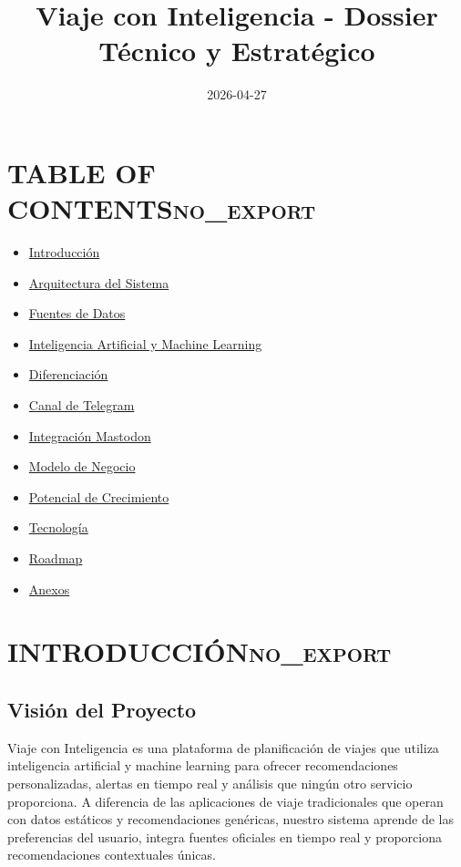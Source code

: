 \documentclass[11pt]{article}
\date{2026-04-27}
\title{Viaje con Inteligencia - Dossier Técnico y Estratégico}
\begin{document}
\maketitle
\tableofcontents


\section*{TABLE OF CONTENTS\hfill{}\textsc{no\_export}}
\label{sec:org53613ad}
\begin{itemize}
\item \hyperref[sec:org76da974]{Introducción}
\item \hyperref[sec:orgcb094a1]{Arquitectura del Sistema}
\item \hyperref[sec:org4c806f0]{Fuentes de Datos}
\item \hyperref[sec:orgb426034]{Inteligencia Artificial y Machine Learning}
\item \hyperref[sec:orgb572a20]{Diferenciación}
\item \hyperref[sec:org3e74d2b]{Canal de Telegram}
\item \hyperref[sec:org7f38bb1]{Integración Mastodon}
\item \hyperref[sec:org076d7f8]{Modelo de Negocio}
\item \hyperref[sec:org0d514bc]{Potencial de Crecimiento}
\item \hyperref[sec:org28fae3a]{Tecnología}
\item \hyperref[sec:org246f1d0]{Roadmap}
\item \hyperref[sec:org902dbd2]{Anexos}
\end{itemize}

\section{INTRODUCCIÓN\hfill{}\textsc{no\_export}}
\label{sec:org76da974}
\subsection{Visión del Proyecto}
\label{sec:orgdd6be1e}

Viaje con Inteligencia es una plataforma de planificación de viajes que utiliza inteligencia artificial y machine learning para ofrecer recomendaciones personalizadas, alertas en tiempo real y análisis que ningún otro servicio proporciona. A diferencia de las aplicaciones de viaje tradicionales que operan con datos estáticos y recomendaciones genéricas, nuestro sistema aprende de las preferencias del usuario, integra fuentes oficiales en tiempo real y proporciona recomendaciones contextuales únicas.
\end{document}

